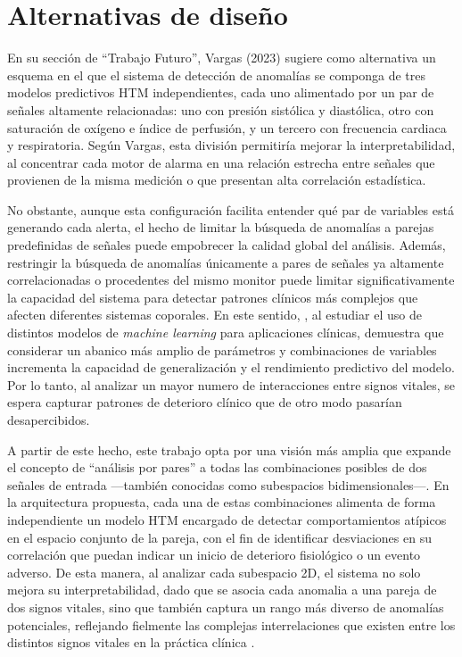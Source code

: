 \section{Alternativas de diseño}

En su sección de “Trabajo Futuro”, Vargas (2023) sugiere como alternativa un esquema en el que el sistema de detección de anomalías se componga de tres modelos predictivos HTM independientes, cada uno alimentado por un par de señales altamente relacionadas: uno con presión sistólica y diastólica, otro con saturación de oxígeno e índice de perfusión, y un tercero con frecuencia cardiaca y respiratoria. Según Vargas, esta división permitiría mejorar la interpretabilidad, al concentrar cada motor de alarma en una relación estrecha entre señales que provienen de la misma medición o que presentan alta correlación estadística.

No obstante, aunque esta configuración facilita entender qué par de variables está generando cada alerta, el hecho de limitar la búsqueda de anomalías a parejas predefinidas de señales puede empobrecer la calidad global del análisis. Además, restringir la búsqueda de anomalías únicamente a pares de señales ya altamente correlacionadas o procedentes del mismo monitor puede limitar significativamente la capacidad del sistema para detectar patrones clínicos más complejos que afecten diferentes sistemas coporales. En este sentido, \textcite{Pieroni2023}, al estudiar el uso de distintos modelos de \textit{machine learning} para aplicaciones clínicas, demuestra que considerar un abanico más amplio de parámetros y combinaciones de variables incrementa la capacidad de generalización y el rendimiento predictivo del modelo. Por lo tanto, al analizar un mayor numero de interacciones entre signos vitales, se espera capturar patrones de deterioro clínico que de otro modo pasarían desapercibidos.

A partir de este hecho, este trabajo opta por una visión más amplia que expande el concepto de “análisis por pares” a todas las combinaciones posibles de dos señales de entrada —también conocidas como subespacios bidimensionales—. En la arquitectura propuesta, cada una de estas combinaciones alimenta de forma independiente un modelo HTM encargado de detectar comportamientos atípicos en el espacio conjunto de la pareja, con el fin de identificar desviaciones en su correlación que puedan indicar un inicio de deterioro fisiológico o un evento adverso. De esta manera, al analizar cada subespacio 2D, el sistema no solo mejora su interpretabilidad, dado que se asocia cada anomalia a una pareja de dos signos vitales, sino que también captura un rango más diverso de anomalías potenciales, reflejando fielmente las complejas interrelaciones que existen entre los distintos signos vitales en la práctica clínica \parencite{Pieroni2023}.
